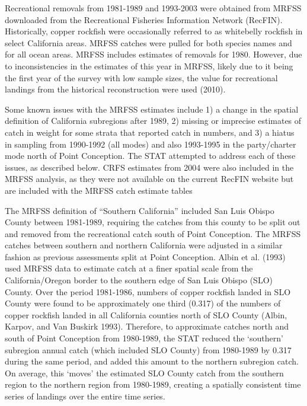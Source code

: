 \documentclass[11pt,
  english,
  letterpaper,
]{article}
\begin{document}
Recreational removals from 1981-1989 and 1993-2003 were obtained from MRFSS downloaded from the Recreational Fisheries Information Network (RecFIN). Historically, copper rockfish were occasionally referred to as whitebelly rockfish in select California areas. MRFSS catches were pulled for both species names and for all ocean areas. MRFSS includes estimates of removals for 1980. However, due to inconsistencies in the estimates of this year in MRFSS, likely due to it being the first year of the survey with low sample sizes, the value for recreational landings from the historical reconstruction were used (2010).

Some known issues with the MRFSS estimates include 1) a change in the spatial definition of California subregions after 1989, 2) missing or imprecise estimates of catch in weight for some strata that reported catch in numbers, and 3) a hiatus in sampling from 1990-1992 (all modes) and also 1993-1995 in the party/charter mode north of Point Conception. The STAT attempted to address each of these issues, as described below. CRFS estimates from 2004 were also included in the MRFSS analysis, as they were not available on the current RecFIN website but are included with the MRFSS catch estimate tables

The MRFSS definition of ``Southern California'' included San Luis Obispo County between 1981-1989, requiring the catches from this county to be split out and removed from the recreational catch south of Point Conception. The MRFSS catches between southern and northern California were adjusted in a similar fashion as previous assessments split at Point Conception. Albin et al. (1993) used MRFSS data to estimate catch at a finer spatial scale from the California/Oregon border to the southern edge of San Luis Obispo (SLO) County. Over the period 1981-1986, numbers of copper rockfish landed in SLO County were found to be approximately one third (0.317) of the numbers of copper rockfish landed in all California counties north of SLO County (Albin, Karpov, and Van Buskirk 1993). Therefore, to approximate catches north and south of Point Conception from 1980-1989, the STAT reduced the `southern' subregion annual catch (which included SLO County) from 1980-1989 by 0.317 during the same period, and added this amount to the northern subregion catch. On average, this `moves' the estimated SLO County catch from the southern region to the northern region from 1980-1989, creating a spatially consistent time series of landings over the entire time series.
\end{document}

